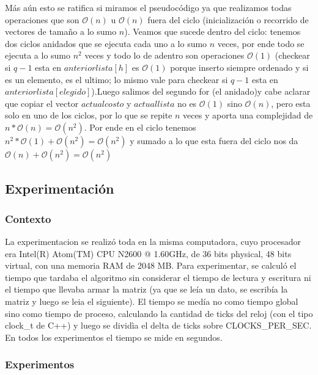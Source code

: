\documentclass[A4paper,oneside,fleqn,11pt]{article}
\theoremstyle{definition}
\begin{document}
Más aún esto se ratifica si miramos el pseudocódigo ya que realizamos todas operaciones que son $\mathcal{O}(n)$ u $\mathcal{O}(n)$ fuera del ciclo (inicialización o recorrido de vectores de tamaño a lo sumo $n$). Veamos que sucede dentro del ciclo: tenemos dos ciclos anidados que se ejecuta cada uno  a lo sumo $n$ veces, por ende todo se ejecuta a lo sumo $n^2$ veces y todo lo de adentro son operaciones $\mathcal{O}(1)$ (checkear si $q-1$ esta en $anteriorlista[h]$ es $\mathcal{O}(1)$ porque inserto siempre ordenado y si es un elemento, es el ultimo; lo mismo vale para checkear si $q-1$ esta en $anteriorlista[elegido]$).Luego salimos del segundo for (el anidado)y cabe aclarar que copiar el vector $actualcosto$ y $actuallista$ no es $\mathcal{O}(1)$ sino $\mathcal{O}(n)$, pero esta solo en uno de los ciclos, por lo que se repite $n$ veces y aporta una complejidad de $n* \mathcal{O}(n)= \mathcal{O}(n^2)$. Por ende en el ciclo tenemos $n^2 *\mathcal{O}(1)+ \mathcal{O}(n^2) = \mathcal{O}(n^2)$ y sumado a lo que esta fuera del ciclo nos da $\mathcal{O}(n)+ \mathcal{O}(n^2) = \mathcal{O}(n^2)$

\subsection{Experimentación}


\subsubsection{Contexto}
La experimentacion se realizó toda en la misma computadora, cuyo procesador era Intel(R) Atom(TM) CPU N2600 @ 1.60GHz, de 36 bits physical, 48 bits virtual, con una memoria RAM de 2048 MB.  Para experimentar, se calculó el tiempo que tardaba el algoritmo sin considerar el tiempo de lectura y escritura ni el tiempo que llevaba armar la matriz (ya que se leía un dato, se escribía la matriz y luego se leia el siguiente). 
El tiempo se medía no como tiempo global sino como tiempo de proceso, calculando la cantidad de ticks del reloj (con el tipo clock\_t de C++) y luego se dividìa el delta de ticks sobre CLOCKS\_PER\_SEC. En todos los experimentos el tiempo se mide en segundos. 
\subsubsection{Experimentos}
\end{document}
